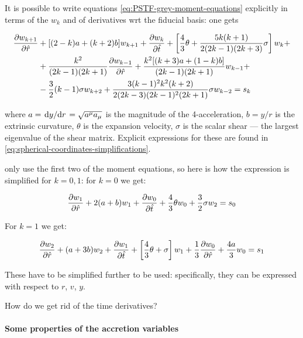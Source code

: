\documentclass[main.tex]{subfiles}
\begin{document}
It is possible to write equations \eqref{eq:PSTF-grey-moment-equations} explicitly in terms of the \(w_k\) and of derivatives wrt the fiducial basis: one gets \cite[eq. 5.10c]{Thorne:1981feb}

\begin{equation}
  \begin{split}
    \pdv{w_{k+1}}{\hat{r}} &+[(2-k) a+(k+2) b] w_{k+1}+\pdv{w_k}{\hat{t}}+\left[\frac{4}{3} \theta+\frac{5 k(k+1)}{2(2 k-1)(2 k+3)} \sigma\right] w_{k} + \\
    &+\frac{k^{2}}{(2 k-1)(2 k+1)} \pdv{w_{k-1}}{\hat{r}}+\frac{k^{2}[(k+3) a+(1-k) b]}{(2 k-1)(2 k+1)} w_{k-1} +  \\
    &-\frac{3}{2}(k-1) \sigma w_{k+2}+\frac{3(k-1)^{2} k^{2}(k+2)}{2(2 k-3)(2 k-1)^{2}(2 k+1)} \sigma w_{k-2} = s_k
    \end{split}
\end{equation}

where \(a = \dv*{y}{r} = \sqrt{a^\mu a_\mu}\) is the magnitude of the 4-acceleration, \(b = y/r\) is the extrinsic curvature, \(\theta\) is the expansion velocity, \(\sigma\) is the scalar shear --- the largest eigenvalue of the shear matrix. Explicit expressions for these are found in  \eqref{eq:spherical-coordinates-simplifications}.

\textcite[]{NobiliTurollaZampieri:1991dec} only use the first two of the moment equations, so here is how the expression is simplified for \(k=0,1\):
for \(k=0\) we get:

\begin{equation}
    \pdv{w_{1}}{\hat{r}} +2( a+ b) w_{1}+\pdv{w_0}{\hat{t}}+\frac{4}{3} \theta w_{0} + \frac{3}{2} \sigma w_{2} = s_0
\end{equation}

For \(k=1\) we get:

\begin{equation}
    \pdv{w_{2}}{\hat{r}} + (a+3 b) w_{2}+\pdv{w_1}{\hat{t}}+\left[\frac{4}{3} \theta+ \sigma\right] w_{1} +\frac{1}{3} \pdv{w_{0}}{\hat{r}}+\frac{4 a}{3} w_{0} = s_1
\end{equation}

These have to be simplified further to be used: specifically, they can be expressed with respect to \(r\), \(v\), \(y\).

\begin{greenbox}
  How do we get rid of the time derivatives?
\end{greenbox}

\paragraph{Some properties of the accretion variables}
\end{document}
